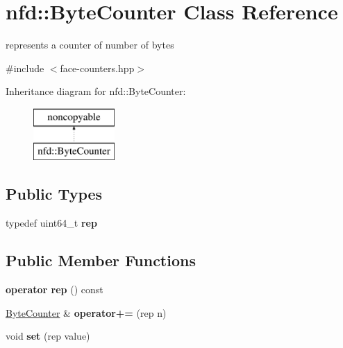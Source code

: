 \hypertarget{classnfd_1_1ByteCounter}{}\section{nfd\+:\+:Byte\+Counter Class Reference}
\label{classnfd_1_1ByteCounter}


represents a counter of number of bytes  




{\ttfamily \#include $<$face-\/counters.\+hpp$>$}

Inheritance diagram for nfd\+:\+:Byte\+Counter\+:\begin{figure}[H]
\begin{center}
\leavevmode
\includegraphics[height=2.000000cm]{classnfd_1_1ByteCounter}
\end{center}
\end{figure}
\subsection*{Public Types}
\begin{DoxyCompactItemize}
\item 
typedef uint64\+\_\+t {\bfseries rep}\hypertarget{classnfd_1_1ByteCounter_a6f9802979dd97144c514b8be0582c25c}{}\label{classnfd_1_1ByteCounter_a6f9802979dd97144c514b8be0582c25c}

\end{DoxyCompactItemize}
\subsection*{Public Member Functions}
\begin{DoxyCompactItemize}
\item 
{\bfseries operator rep} () const\hypertarget{classnfd_1_1ByteCounter_a8937e3f9df07faf26ed8b50108aae6a8}{}\label{classnfd_1_1ByteCounter_a8937e3f9df07faf26ed8b50108aae6a8}

\item 
\hyperlink{classnfd_1_1ByteCounter}{Byte\+Counter} \& {\bfseries operator+=} (rep n)\hypertarget{classnfd_1_1ByteCounter_ae9cb0a6940f4e589da282ecbe4e8c1c7}{}\label{classnfd_1_1ByteCounter_ae9cb0a6940f4e589da282ecbe4e8c1c7}

\item 
void {\bfseries set} (rep value)\hypertarget{classnfd_1_1ByteCounter_ae81e005723b74bf09cbb7f5e06040bcd}{}\label{classnfd_1_1ByteCounter_ae81e005723b74bf09cbb7f5e06040bcd}

\end{DoxyCompactItemize}


